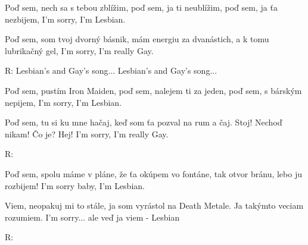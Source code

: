 \resetVars
{}
\MakeHeader
\Lyrics

Poď sem, nech sa s tebou zblížim, poď sem, ja ti neublížim,
poď sem, ja ťa nezbijem, I'm sorry, I'm Lesbian.

Poď sem, som tvoj dvorný básnik, mám energiu za dvanástich,
a k tomu lubrikačný gel, I'm sorry, I'm really Gay.

R: Lesbian's and Gay's song...
Lesbian's and Gay's song...

Poď sem, pustím Iron Maiden, poď sem, nalejem ti za jeden,
poď sem, s bárským nepijem, I'm sorry, I'm Lesbian.

Poď sem, tu si ku mne hačaj, keď som ťa pozval na rum a čaj.
Stoj! Nechoď nikam! Čo je? Hej! I'm sorry, I'm really Gay.

R:

Poď sem, spolu máme v pláne, že ťa okúpem vo fontáne,
tak otvor bránu, lebo ju rozbijem! I'm sorry baby, I'm Lesbian.

Viem, neopakuj mi to stále, ja som vyrástol na Death Metale.
Ja takýmto veciam rozumiem. I'm sorry... ale veď ja viem - Lesbian

R:

\Next
